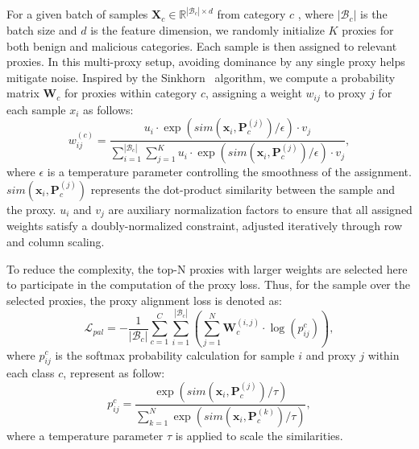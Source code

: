 
For a given batch of samples $\mathbf{X}_c \in \mathbb{R}^{|\mathcal{B}_c| \times d}$ from category $c$ , where $|\mathcal{B}_c|$ is the batch size and $d$ is the feature dimension, we randomly initialize $K$ proxies for both benign and malicious categories. Each sample is then assigned to relevant proxies. In this multi-proxy setup, avoiding dominance by any single proxy helps mitigate noise. Inspired by the Sinkhorn~\cite{sinkhorn} algorithm, we compute a probability matrix $\mathbf{W}_c$ for proxies within category $c$, assigning a weight $w_{ij}$ to proxy $j$ for each sample $x_i$ as follows:
\begin{equation}
w_{i j}^{(c)}=\frac{u_i \cdot \exp \left(sim(\mathbf{x}_i, \mathbf{P}_c^{(j)})/\epsilon\right) \cdot v_j}{\sum_{i=1}^{|\mathcal{B}_c|} \sum_{j=1}^K u_i \cdot \exp \left(sim(\mathbf{x}_i, \mathbf{P}_c^{(j)})/\epsilon\right) \cdot v_j},
\end{equation}
where $\epsilon$ is a temperature parameter controlling the smoothness of the assignment. $sim(\mathbf{x}_i, \mathbf{P}_c^{(j)})$ represents the dot-product similarity between the sample and the proxy. $u_i$ and $v_j$ are auxiliary normalization factors to ensure that all assigned weights satisfy a doubly-normalized constraint, adjusted iteratively through row and column scaling.

To reduce the complexity, the top-N proxies with larger weights are selected here to participate in the computation of the proxy loss. Thus, for the sample over the selected proxies, the proxy alignment loss is denoted as:
\begin{equation}
\mathcal{L}_{pal}=-\frac{1}{|\mathcal{B}_c|} \sum_{c=1}^C \sum_{i=1}^{|\mathcal{B}_c|}\left(\sum_{j=1}^N \mathbf{W}_c^{(i, j)} \cdot \log \left(p_{i j}^c\right)\right),
\end{equation}
where $p_{i j}^c$ is the softmax probability calculation for sample $i$ and proxy $j$ within each class $c$, represent as follow:
\begin{equation}
p_{i j}^c=\frac{\exp \left(sim(\mathbf{x}_i, \mathbf{P}_c^{(j)}) / \tau\right)}{\sum_{k=1}^N \exp \left(sim(\mathbf{x}_i, \mathbf{P}_c^{(k)}) / \tau\right)},
\end{equation}
where a temperature parameter $\tau$ is applied to scale the similarities.

